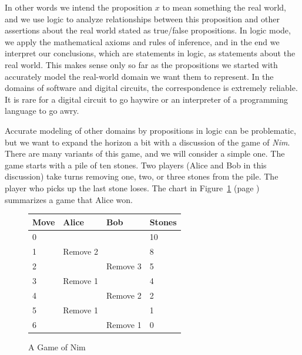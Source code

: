 {In other words we intend the proposition $x$ 
to mean something the real world,
and we use logic to analyze relationships between this proposition and other
assertions about the real world stated as true/false propositions.
In logic mode, we apply the mathematical axioms and rules of inference,
and in the end we interpret our conclusions, which are statements in logic,
as statements about the real world.
This makes sense only so far as the propositions we started with
accurately model the real-world domain we want them to represent.
In the domains of software and digital circuits,
the correspondence is extremely reliable.
It is rare for a digital circuit to go haywire or an interpreter of
a programming language to go awry.

Accurate modeling of other domains by propositions in logic can be problematic,
but we want to expand the horizon a bit with a discussion
of the game of \emph{Nim}.
There are many variants of this game, and we will consider a simple one.
The game starts with a pile of ten stones. Two players (Alice and Bob in this discussion)
take turns removing one, two, or three stones from the pile.
The player who picks up the last stone loses.
The chart in
Figure~\ref{fig:example-nim-game} (page \pageref{fig:example-nim-game})
summarizes a game that Alice won.

\begin{figure}
\begin{center}
\begin{tabular}{l|l|l|l}
Move & Alice     & Bob      & Stones \\
\hline
0    &           &          & 10     \\
1    & Remove 2  &          & 8      \\
2    &           & Remove 3 & 5      \\
3    & Remove 1  &          & 4      \\
4    &           & Remove 2 & 2      \\
5    & Remove 1  &          & 1      \\
6    &           & Remove 1 & 0      \\
\end{tabular}
\end{center}
\caption{A Game of Nim}
\label{fig:example-nim-game}
\end{figure}

}
